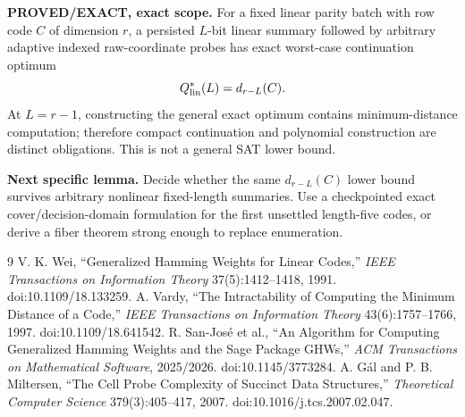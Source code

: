 \documentclass[11pt]{article}
\begin{document}
\textbf{PROVED/EXACT, exact scope.}  For a fixed linear parity batch with row code $C$ of dimension $r$, a persisted $L$-bit linear summary followed by arbitrary adaptive indexed raw-coordinate probes has exact worst-case continuation optimum
\[
Q^*_{\rm lin}(L)=d_{r-L}(C).
\]
At $L=r-1$, constructing the general exact optimum contains minimum-distance computation; therefore compact continuation and polynomial construction are distinct obligations.  This is not a general SAT lower bound.

\textbf{Next specific lemma.}  Decide whether the same $d_{r-L}(C)$ lower bound survives arbitrary nonlinear fixed-length summaries.  Use a checkpointed exact cover/decision-domain formulation for the first unsettled length-five codes, or derive a fiber theorem strong enough to replace enumeration.

\begin{thebibliography}{9}
 V. K. Wei, ``Generalized Hamming Weights for Linear Codes,'' \emph{IEEE Transactions on Information Theory} 37(5):1412--1418, 1991. doi:10.1109/18.133259.
 A. Vardy, ``The Intractability of Computing the Minimum Distance of a Code,'' \emph{IEEE Transactions on Information Theory} 43(6):1757--1766, 1997. doi:10.1109/18.641542.
 R. San-Jos\'e et al., ``An Algorithm for Computing Generalized Hamming Weights and the Sage Package GHWs,'' \emph{ACM Transactions on Mathematical Software}, 2025/2026. doi:10.1145/3773284.
 A. G\'al and P. B. Miltersen, ``The Cell Probe Complexity of Succinct Data Structures,'' \emph{Theoretical Computer Science} 379(3):405--417, 2007. doi:10.1016/j.tcs.2007.02.047.
\end{thebibliography}

\end{document}
